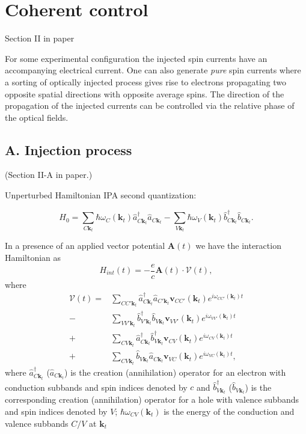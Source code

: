 \documentclass{article}
\newcommand{\kt}{\mathbf{k}_{t}}
\begin{document}
\newpage
\section{Coherent control} %
\label{sec:coherent_control}
{\small Section II in paper \\}

For some experimental configuration the injected spin currents have an
accompanying electrical current. One can also generate \emph{pure} spin currents
where a sorting of optically injected process gives rise to electrons
propagating two opposite spatial directions with opposite average spins. The
direction of the propagation of the injected currents can be controlled via the
relative phase of the optical fields.

\subsection{A. Injection process}
{\small (Section II-A in paper.) \\}

Unperturbed Hamiltonian IPA second quantization:

\begin{equation*}\label{eq:unperturbed_hamiltonian}
H_{0} = \sum_{C\kt} \hbar \omega_{C}(\kt) \hat{a}^{\dag}_{C\kt} \hat{a}^{}_{C\kt}  - 
        \sum_{V\kt} \hbar \omega_{V}(\kt) \hat{b}^{\dag}_{C\kt} \hat{b}^{}_{C\kt}.
\end{equation*}

In a presence of an applied vector potential $\mathbf{A}(t)$ we have the
interaction Hamiltonian as
\begin{equation*}\label{eq:interaction_hamiltonian}
H_{int}(t) = - \frac{e}{c} \mathbf{A}(t) \cdot \mathcal{V}(t),
\end{equation*}
where
\begin{align*}
\mathcal{V}(t)  
=& \sum_{CC'\kt} \hat{a}^{\dag}_{C \kt} \hat{a}       _{C'\kt} 
\mathbf{v}_{CC'}(\kt) e^{i\omega_{CC'}(\kt)t} \\
-& \sum_{VV'\kt} \hat{b}^{\dag}_{V'\kt} \hat{b}       _{V \kt} 
\mathbf{v}_{VV'}(\kt) e^{i\omega_{VV'}(\kt)t} \\
+& \sum_{CV \kt} \hat{a}^{\dag}_{C \kt} \hat{b}^{\dag}_{V \kt} 
\mathbf{v}_{CV }(\kt) e^{i\omega_{CV }(\kt)t} \\
+& \sum_{CV \kt} \hat{b}       _{V \kt} \hat{a}       _{C \kt} 
\mathbf{v}_{VC }(\kt) e^{i\omega_{VC }(\kt)t},
\end{align*}
where $\hat{a}^{\dag}_{C\kt} $ ($\hat{a}_{C\kt}$) is the creation (annihilation)
operator for an electron with conduction subbands and spin indices denoted by
$c$ and $\hat{b}^{\dag}_{V\kt} $ ($\hat{b}_{V\kt}$) is the corresponding
creation (annihilation) operator for a hole with valence subbands and spin
indices denoted by $V$; $\hbar\omega_{CV}(\kt)$ is the energy of the conduction
and valence subbands $C/V$ at $\kt$
\end{document}
